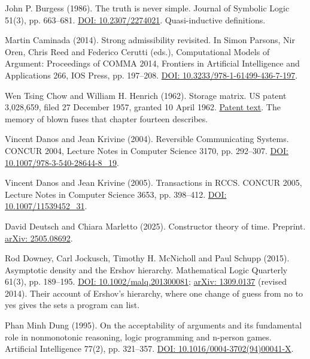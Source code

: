 \noindent John P. Burgess (1986). The truth is never simple. Journal of Symbolic Logic 51(3), pp. 663--681. \href{https://doi.org/10.2307/2274021}{DOI: 10.2307/2274021}. Quasi-inductive definitions.
\par\medskip

\noindent Martin Caminada (2014). Strong admissibility revisited. In Simon Parsons, Nir Oren, Chris Reed and Federico Cerutti (eds.), Computational Models of Argument: Proceedings of COMMA 2014, Frontiers in Artificial Intelligence and Applications 266, IOS Press, pp. 197--208. \href{https://doi.org/10.3233/978-1-61499-436-7-197}{DOI: 10.3233/978-1-61499-436-7-197}.
\par\medskip

\noindent Wen Tsing Chow and William H. Henrich (1962). Storage matrix. US patent 3,028,659, filed 27 December 1957, granted 10 April 1962. \href{https://patents.google.com/patent/US3028659A/en}{Patent text}. The memory of blown fuses that chapter fourteen describes.
\par\medskip

\noindent Vincent Danos and Jean Krivine (2004). Reversible Communicating Systems. CONCUR 2004, Lecture Notes in Computer Science 3170, pp. 292--307. \href{https://doi.org/10.1007/978-3-540-28644-8_19}{DOI: 10.1007/978-3-540-28644-8\_19}.
\par\medskip

\noindent Vincent Danos and Jean Krivine (2005). Transactions in RCCS. CONCUR 2005, Lecture Notes in Computer Science 3653, pp. 398--412. \href{https://doi.org/10.1007/11539452_31}{DOI: 10.1007/11539452\_31}.
\par\medskip

\noindent David Deutsch and Chiara Marletto (2025). Constructor theory of time. Preprint. \href{https://arxiv.org/abs/2505.08692}{arXiv: 2505.08692}.
\par\medskip

\noindent Rod Downey, Carl Jockusch, Timothy H. McNicholl and Paul Schupp (2015). Asymptotic density and the Ershov hierarchy. Mathematical Logic Quarterly 61(3), pp. 189--195. \href{https://doi.org/10.1002/malq.201300081}{DOI: 10.1002/malq.201300081}; \href{https://arxiv.org/abs/1309.0137}{arXiv: 1309.0137} (revised 2014). Their account of Ershov's hierarchy, where one change of guess from no to yes gives the sets a program can list.
\par\medskip

\noindent Phan Minh Dung (1995). On the acceptability of arguments and its fundamental role in nonmonotonic reasoning, logic programming and n-person games. Artificial Intelligence 77(2), pp. 321--357. \href{https://doi.org/10.1016/0004-3702(94)00041-X}{DOI: 10.1016/0004-3702(94)00041-X}.
\par\medskip

